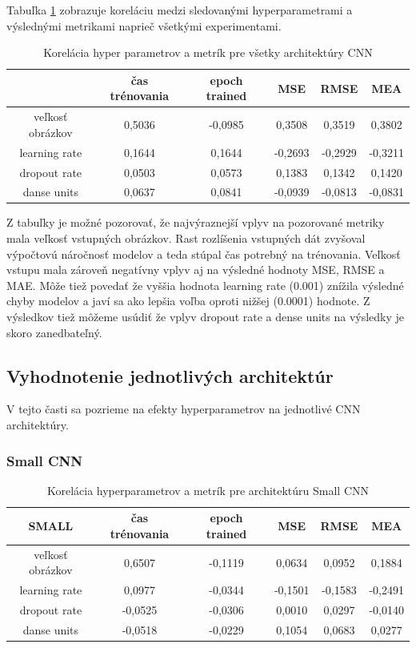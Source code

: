 Tabuľka \ref{tab:global_corr} zobrazuje koreláciu medzi sledovanými hyperparametrami a výslednými metrikami naprieč všetkými experimentami.

\begin{table}[H]
\caption{Korelácia hyper parametrov a metrík pre všetky architektúry CNN}
\label{tab:global_corr}
\begin{tabular}{ | c | c c c c c |}
\hline
					& čas trénovania 	&  epoch trained 	& MSE 			&  RMSE 		& MEA  \\
\hline
veľkosť obrázkov 	&  0,5036 			&  -0,0985			& 0,3508	 	& 0,3519 		& 0,3802 \\
learning rate 		&  0,1644  			&  0,1644			& -0,2693 		& -0,2929 		& -0,3211\\
dropout rate 		&  0,0503  			&  0,0573			& 0,1383		& 0,1342 		& 0,1420 \\
danse units			&  0,0637	  		&  0,0841			& -0,0939		& -0,0813 		& -0,0831 \\
\hline
\end{tabular}
\end{table}
Z tabuľky je možné pozorovať, že najvýraznejší vplyv na pozorované metriky mala veľkosť vstupných obrázkov.  Rast rozlíšenia vstupných dát zvyšoval výpočtovú náročnosť modelov a teda stúpal čas potrebný na trénovania. Veľkosť vstupu mala zároveň negatívny vplyv aj na výsledné hodnoty MSE, RMSE a MAE. 
Môže tiež povedať že vyššia hodnota learning rate (0.001) znížila výsledné chyby modelov a javí sa ako lepšia voľba oproti nižšej (0.0001) hodnote. 
Z výsledkov tiež môžeme usúdiť že vplyv dropout rate a dense units na výsledky je skoro zanedbateľný.

\subsection{Vyhodnotenie jednotlivých architektúr}
V tejto časti sa pozrieme na efekty hyperparametrov na jednotlivé CNN architektúry. 
\subsubsection{Small CNN }

\begin{table}[h]
\caption{Korelácia hyperparametrov a metrík pre architektúru Small CNN}
\label{tab:small_corr}
\begin{tabular}{ | c |  c  c c c  c |}
\hline
	SMALL			& čas trénovania &  epoch trained & MSE 		&  RMSE  	& MEA  	\\
\hline
veľkosť obrázkov 	& 0,6507 		& -0,1119 		& 0,0634 	& 0,0952 	& 0,1884\\
learning rate 		&0,0977  		& -0,0344 		& -0,1501 	& -0,1583 	& -0,2491\\
dropout rate 		& -0,0525 		& -0,0306 		& 0,0010 	& 0,0297 	& -0,0140\\
danse units 			&  -0,0518 		& -0,0229 		& 0,1054 	& 0,0683	& 0,0277\\
\hline
\end{tabular}
\end{table}

